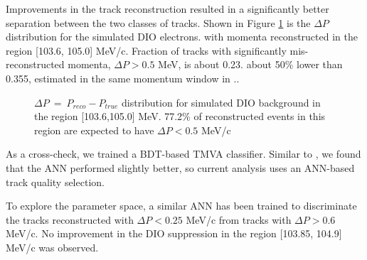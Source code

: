 Improvements in the track reconstruction resulted in a significantly better separation between the two classes of tracks.
Shown in Figure \ref{fig:dio_delta_p_1036_1050} is the $\Delta{P}$ distribution for the simulated DIO electrons.
with momenta reconstructed in the region [103.6, 105.0] MeV/c.
Fraction of tracks with significantly mis-reconstructed momenta, $\Delta{P} > 0.5$ MeV, is about 0.23.
about 50\% lower than 0.355, estimated in the same momentum window in \cite{MU2E_4595_ANN_TRAINING}..

\begin{figure}
  \caption{
    \label{fig:dio_delta_p_1036_1050} 
    $\Delta P ~=~ P_{reco} -P_{true}$ distribution for simulated DIO background in the region [103.6,105.0] MeV.
    77.2\% of reconstructed events in this region are expected to have $\Delta P < 0.5$ MeV/c
  }
\end{figure}

As a cross-check, we trained a BDT-based TMVA classifier. Similar to \cite{MU2E_33150_ANN_TRAINING},
we found that the ANN performed slightly better, so current analysis uses an ANN-based track
quality selection.

To explore the parameter space, a similar ANN has been trained to discriminate the tracks reconstructed
with $\Delta{P} < 0.25$ MeV/c from tracks with $\Delta{P} > 0.6$ MeV/c. No improvement in the DIO
suppression in the region [103.85, 104.9] MeV/c was observed. 

